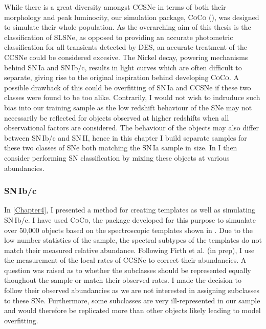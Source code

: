 While there is a great diversity amongst CCSNe in terms of both their morphology and peak luminocity, our simulation package, \textsc{CoCo} (), was designed to simulate their whole population. As the overarching aim of this thesis is the classification of SLSNe, as opposed to providing an accurate photometric classification for all transients detected by DES, an accurate treatment of the CCSNe could be considered excesive. The Nickel decay, powering mechanisms behind SN\,Ia and SN\,Ib/c, results in light curves which are often difficult to separate, giving rise to the original inspiration behind developing \textsc{CoCo}. A possible drawback of this could be overfitting of SN\,Ia and CCSNe if these two classes were found to be too alike. Contrarily, I would not wish to indruduce such bias into our training sample as the low redshift behaviour of the SNe may not necessarily be reflected for objects observed at higher redshifts when all observational factors are considered. The behaviour of the objects may also differ between SN\,Ib/c and SN\,II, hence in this chapter I build separate samples for these two classes of SNe both matching the SN\,Ia sample in size. In  I then consider performing SN classification by mixing these objects at various abundancies.

\subsubsection{SN\,Ib/c}
In \cref{Chapter4}, I presented a method for creating templates as well as simulating SN\,Ib/c. I have used \textsc{CoCo}, the package developed for this purpose to simualate over 50,000 objects based on the spectroscopic templates shown in . Due to the low number statistics of the sample, the spectral subtypes of the templates do not match their measured relative abundance. Following Firth et al. (in prep), I use the \citet{Li2011} measurement of the local rates of CCSNe to correct their abundancies. A question was raised as to whether the subclasses should be represented equally thoughout the sample or match their observed rates. I made the decision to follow their observed abundancies as we are not interested in assigning subclasses to these SNe. Furthermore, some subclasses are very ill-represented in our sample and would therefore be replicated more than other objects likely leading to model overfitting.

\begin{table}
  \caption{}
  \label{tab:IbcTemplates}

\end{table}

